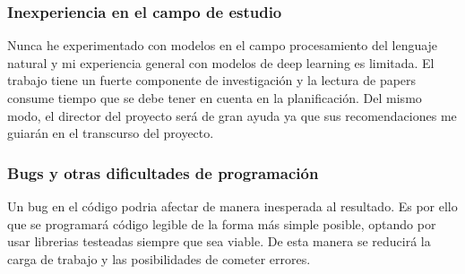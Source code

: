 \subsubsection{Inexperiencia en el campo de estudio}
Nunca he experimentado con modelos en el campo procesamiento del lenguaje natural
y mi experiencia general con modelos de deep learning es limitada. El trabajo tiene un fuerte componente
de investigación y la lectura de papers consume tiempo que se debe tener en cuenta en la
planificación.
Del mismo modo, el director del proyecto será de gran ayuda ya que sus recomendaciones me guiarán en el
transcurso del proyecto.
\subsubsection{Bugs y otras dificultades de programación}
Un bug en el código podria afectar de manera inesperada al resultado. Es por ello
que se programará código legible de la forma más simple posible, optando por usar librerias testeadas siempre
que sea viable. De esta manera se reducirá la carga de trabajo y las posibilidades de cometer errores.
